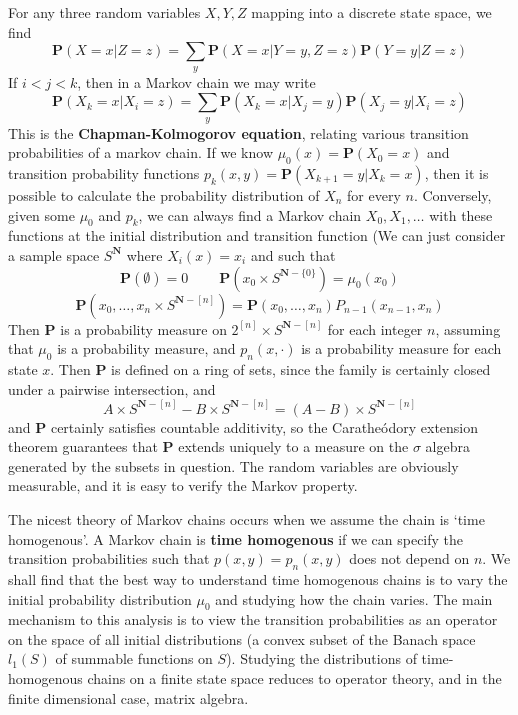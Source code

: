 For any three random variables $X,Y,Z$ mapping into a discrete state space, we find
%
\[ \mathbf{P}(X = x | Z = z) = \sum_y \mathbf{P}(X = x | Y = y, Z = z) \mathbf{P}(Y = y| Z = z) \]
%
If $i < j < k$, then in a Markov chain we may write
%
\[ \mathbf{P}(X_k = x | X_i = z) = \sum_y \mathbf{P}(X_k = x | X_j = y) \mathbf{P}(X_j = y | X_i = z) \]
%
This is the {\bf Chapman-Kolmogorov equation}, relating various transition probabilities of a markov chain. If we know $\mu_0(x) = \mathbf{P}(X_0 = x)$ and transition probability functions $p_k(x,y) = \mathbf{P}(X_{k+1} = y | X_k = x)$, then it is possible to calculate the probability distribution of $X_n$ for every $n$. Conversely, given some $\mu_0$ and $p_k$, we can always find a Markov chain $X_0, X_1, \dots$ with these functions at the initial distribution and transition function (We can just consider a sample space $S^{\mathbf{N}}$ where $X_i(x) = x_i$ and such that
%
\[ \mathbf{P}(\emptyset) = 0\ \ \ \ \ \ \ \ \ \ \mathbf{P}(x_0 \times S^{\mathbf{N} - \{ 0 \}}) = \mu_0(x_0) \]
\[ \mathbf{P}(x_0, \dots, x_n \times S^{\mathbf{N} - [n]}) = \mathbf{P}(x_0, \dots, x_n) P_{n-1}(x_{n-1},x_n) \]
%
Then $\mathbf{P}$ is a probability measure on $2^{[n]} \times S^{\mathbf{N} - [n]}$ for each integer $n$, assuming that $\mu_0$ is a probability measure, and $p_n(x,\cdot)$ is a probability measure for each state $x$. Then $\mathbf{P}$ is defined on a ring of sets, since the family is certainly closed under a pairwise intersection, and
%
\[ A \times S^{\mathbf{N}-[n]} - B \times S^{\mathbf{N}-[n]} = (A - B) \times S^{\mathbf{N}-[n]} \]
%
and $\mathbf{P}$ certainly satisfies countable additivity, so the Carathe\'{o}dory extension theorem guarantees that $\mathbf{P}$ extends uniquely to a measure on the $\sigma$ algebra generated by the subsets in question. The random variables are obviously measurable, and it is easy to verify the Markov property.

The nicest theory of Markov chains occurs when we assume the chain is `time homogenous'. A Markov chain is {\bf time homogenous} if we can specify the transition probabilities such that $p(x,y) = p_n(x,y)$ does not depend on $n$. We shall find that the best way to understand time homogenous chains is to vary the initial probability distribution $\mu_0$ and studying how the chain varies. The main mechanism to this analysis is to view the transition probabilities as an operator on the space of all initial distributions (a convex subset of the Banach space $l_1(S)$ of summable functions on $S$). Studying the distributions of time-homogenous chains on a finite state space reduces to operator theory, and in the finite dimensional case, matrix algebra.


